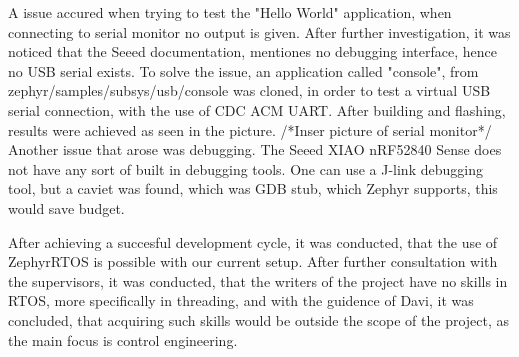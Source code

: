 \documentclass[a4paper,11pt]{article}
\begin{document}
A issue accured when trying to test the "Hello World" application, when connecting to serial monitor no output is given.
After further investigation, it was noticed that the Seeed documentation, mentiones no debugging interface, hence no USB serial exists.
To solve the issue, an application called "console", from zephyr/samples/subsys/usb/console was cloned, in order to test a virtual USB serial connection, with the use of CDC ACM UART.
After building and flashing, results were achieved as seen in the picture.
/*Inser picture of serial monitor*/
Another issue that arose was debugging. The Seeed XIAO nRF52840 Sense does not have any sort of built in debugging tools. 
One can use a J-link debugging tool, but a caviet was found, which was GDB stub, which Zephyr supports, this would save budget. 

After achieving a succesful development cycle, it was conducted, that the use of ZephyrRTOS is possible with our current setup.
After further consultation with the supervisors, it was conducted, that the writers of the project have no skills in RTOS, more specifically in threading, and with the guidence of Davi, it was concluded, that acquiring such skills would be outside the scope of the project, as the main focus is control engineering.



\end{document}
